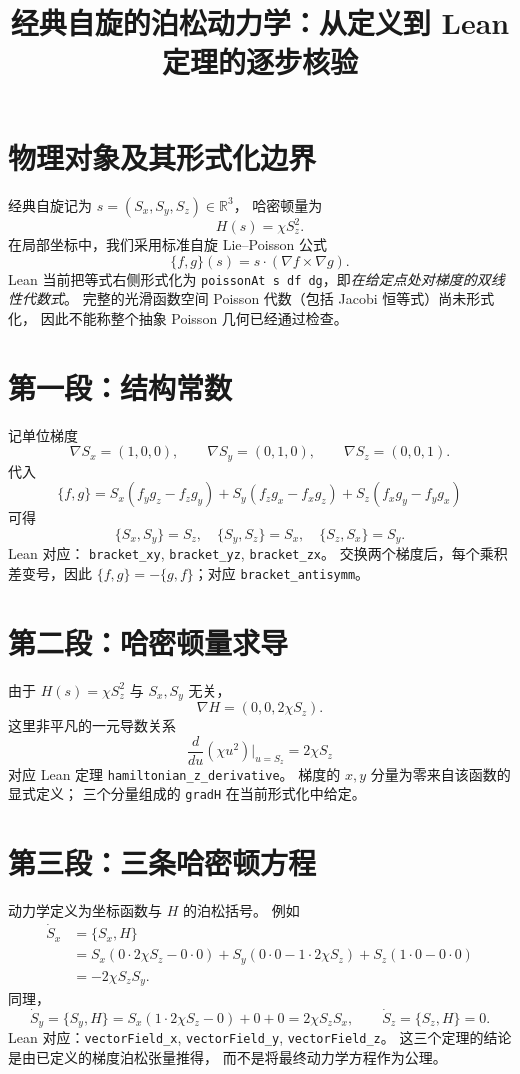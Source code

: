 \documentclass[UTF8,11pt]{ctexart}
\title{经典自旋的泊松动力学：从定义到 Lean 定理的逐步核验}
\date{}
\begin{document}
\maketitle

\section{物理对象及其形式化边界}
经典自旋记为 $s=(S_x,S_y,S_z)\in\mathbb R^3$，
哈密顿量为
\[
 H(s)=\chi S_z^2.
\]
在局部坐标中，我们采用标准自旋 Lie--Poisson 公式
\[
 \{f,g\}(s)=s\cdot(\nabla f\times\nabla g).
\]
Lean 当前把等式右侧形式化为
\texttt{poissonAt s df dg}，即\emph{在给定点处对梯度的双线性代数式}。
完整的光滑函数空间 Poisson 代数（包括 Jacobi 恒等式）尚未形式化，
因此不能称整个抽象 Poisson 几何已经通过检查。

\section{第一段：结构常数}
记单位梯度
\[
 \nabla S_x=(1,0,0),\qquad \nabla S_y=(0,1,0),
 \qquad \nabla S_z=(0,0,1).
\]
代入
\[
 \{f,g\}
 =S_x(f_y g_z-f_zg_y)
 +S_y(f_zg_x-f_xg_z)
 +S_z(f_xg_y-f_yg_x)
\]
可得
\[
 \{S_x,S_y\}=S_z,\quad
 \{S_y,S_z\}=S_x,\quad
 \{S_z,S_x\}=S_y.
\]
Lean 对应：
\texttt{bracket\_xy}, \texttt{bracket\_yz},
\texttt{bracket\_zx}。
交换两个梯度后，每个乘积差变号，因此
$\{f,g\}=-\{g,f\}$；对应 \texttt{bracket\_antisymm}。

\section{第二段：哈密顿量求导}
由于 $H(s)=\chi S_z^2$ 与 $S_x,S_y$ 无关，
\[
 \nabla H=(0,0,2\chi S_z).
\]
这里非平凡的一元导数关系
\[
 \frac{d}{du}(\chi u^2)\bigg|_{u=S_z}=2\chi S_z
\]
对应 Lean 定理 \texttt{hamiltonian\_z\_derivative}。
梯度的 $x,y$ 分量为零来自该函数的显式定义；
三个分量组成的 \texttt{gradH} 在当前形式化中给定。

\section{第三段：三条哈密顿方程}
动力学定义为坐标函数与 $H$ 的泊松括号。
例如
\[
 \begin{aligned}
 \dot S_x
 &=\{S_x,H\}\\
 &=S_x(0\cdot 2\chi S_z-0\cdot 0)
 +S_y(0\cdot0-1\cdot2\chi S_z)
 +S_z(1\cdot0-0\cdot0)\\
 &=-2\chi S_zS_y.
 \end{aligned}
\]
同理，
\[
 \dot S_y=\{S_y,H\}
 =S_x(1\cdot2\chi S_z-0)+0+0
 =2\chi S_zS_x,
\qquad
\dot S_z=\{S_z,H\}=0.
\]
Lean 对应：\texttt{vectorField\_x},
\texttt{vectorField\_y}, \texttt{vectorField\_z}。
这三个定理的结论是由已定义的梯度泊松张量推得，
而不是将最终动力学方程作为公理。
\end{document}
